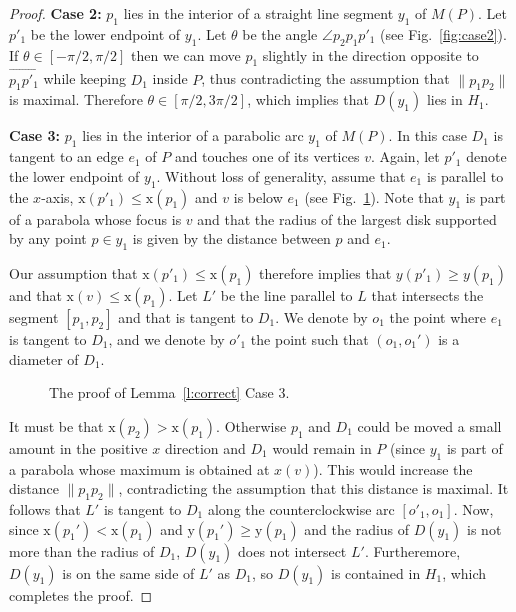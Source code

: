 \documentclass[twoside]{report}
\newcommand{\figlabel}[1]{\label{fig:#1}}
\newcommand{\figref}[1]{\mbox{Fig.~\ref{fig:#1}}}
\newcommand{\x}{\mathrm{x}}
\newcommand{\y}{\mathrm{y}}
\begin{document}
\begin{paper}
\begin{proof}
  \noindent\textbf{Case 2:} $p_1$ lies in the interior of a straight
  line segment $y_1$ of $M(P)$.  Let $p'_1$ be the lower endpoint of
  $y_1$. Let $\theta$ be the angle $\angle p_2p_1p'_1$ (see
  \figref{case2}).  If $\theta \in [-\pi/2,\pi/2]$ then we can move
  $p_1$ slightly in the direction opposite to
  $\overrightarrow{p_1p'_1}$ while keeping $D_1$ inside $P$, thus
  contradicting the assumption that $\|p_1p_2\|$ is maximal. Therefore
  $\theta \in [\pi/2,3\pi/2]$, which implies that $D(y_1)$ lies in
  $H_1$.
  
  \noindent\textbf{Case 3:} $p_1$ lies in the interior of a parabolic
  arc $y_1$ of $M(P)$.  In this case $D_1$ is tangent to an edge $e_1$
  of $P$ and touches one of its vertices $v$. Again, let $p'_1$ denote
  the lower endpoint of $y_1$.  Without loss of generality, assume
  that $e_1$ is parallel to the $x$-axis, $\x(p'_1)\le \x(p_1)$ and $v$
  is below $e_1$ (see \figref{case3}).  Note that $y_1$ is part of a
  parabola whose focus is $v$ and that the radius of the largest disk
  supported by any point $p\in y_1$ is given by the distance between $p$
  and $e_1$.

  Our assumption that $\x(p'_1)\le \x(p_1)$ therefore implies that
  $y(p'_1)\ge y(p_1)$ and that $\x(v)\le \x(p_1)$.  Let $L'$ be the line
  parallel to $L$ that intersects the segment $[p_1,p_2]$ and that is
  tangent to $D_1$. We denote by $o_1$ the point where $e_1$ is
  tangent to $D_1$, and we denote by $o'_1$ the point such that
  $(o_1,o_1')$ is a diameter of $D_1$.

  \begin{figure}
    \begin{center} 
    \end{center}
    \caption{The proof of Lemma~\ref{l:correct} Case 3.}
    \figlabel{case3}
  \end{figure}

  It must be that $\x(p_2)>\x(p_1)$. Otherwise $p_1$ and $D_1$ could
  be moved a small amount in the positive $x$ direction and $D_1$
  would remain in $P$ (since $y_1$ is part of a parabola whose maximum
  is obtained at $x(v)$).  This would increase the distance
  $\|p_1p_2\|$, contradicting the assumption that this distance is
  maximal.  It follows that $L'$ is tangent to $D_1$ along the
  counterclockwise arc $[o'_1,o_1]$.  Now, since $\x(p_1')<\x(p_1)$
  and $\y(p_1')\ge \y(p_1)$ and the radius of $D(y_1)$ is not more
  than the radius of $D_1$, $D(y_1)$ does not intersect $L'$.
  Furtheremore, $D(y_1)$ is on the same side of $L'$ as $D_1$, so
  $D(y_1)$ is contained in $H_1$, which completes the proof.
\end{proof}


\end{paper}
\end{document}
